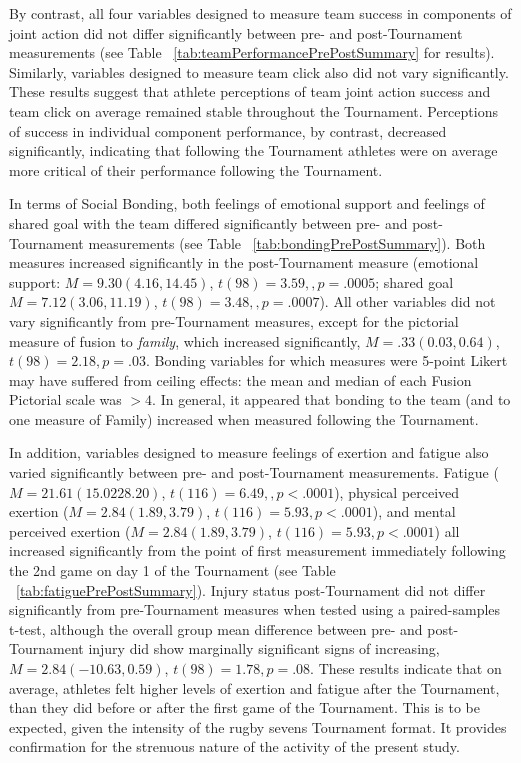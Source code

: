 By contrast, all four variables designed to measure team success in components of joint action did not differ significantly between pre- and post-Tournament measurements (see Table ~\ref{tab:teamPerformancePrePostSummary} for results).  Similarly, variables designed to measure team click also did not vary significantly.  These results suggest that athlete perceptions of team joint action success and team click on average remained stable throughout the Tournament.  Perceptions of success in individual component performance, by contrast, decreased significantly, indicating that following the Tournament athletes were on average more critical of their performance following the Tournament.

In terms of Social Bonding, both feelings of emotional support and feelings of shared goal with the team differed significantly between pre- and post-Tournament measurements (see Table ~\ref{tab:bondingPrePostSummary}). Both measures increased significantly in the post-Tournament measure (emotional support: $M = 9.30 (4.16, 14.45)$, $t(98)= 3.59,, p = .0005$; shared goal $M = 7.12 (3.06, 11.19)$, $t(98)= 3.48,, p = .0007$).  All other variables did not vary significantly from pre-Tournament measures, except for the pictorial measure of fusion to \textit{family}, which increased significantly, $M = .33 (0.03, 0.64)$, $t(98)= 2.18, p = .03$.  Bonding variables for which measures were 5-point Likert may have suffered from ceiling effects: the mean and median of each Fusion Pictorial scale was $> 4$.  In general, it appeared that bonding to the team (and to one measure of Family) increased when measured following the Tournament.

In addition, variables designed to measure feelings of exertion and fatigue also varied significantly between pre- and post-Tournament measurements.  Fatigue ($M = 21.61 (15.02 28.20)$, $t(116)= 6.49,, p < .0001$), physical perceived exertion ($M = 2.84 (1.89, 3.79)$, $t(116)= 5.93, p < .0001$), and mental perceived exertion ($M = 2.84 (1.89, 3.79)$, $t(116)= 5.93, p < .0001$) all increased significantly from the point of first measurement immediately following the 2nd game on day 1 of the Tournament (see Table ~\ref{tab:fatiguePrePostSummary}).  Injury status post-Tournament did not differ significantly from pre-Tournament measures when tested using a paired-samples t-test, although the overall group mean difference between pre- and post-Tournament injury did show marginally significant signs of increasing, $M = 2.84 (-10.63, 0.59)$, $t(98)= 1.78, p = .08$.
These results indicate that on average, athletes felt higher levels of exertion and fatigue after the Tournament, than they did before or after the first game of the Tournament. This is to be expected, given the intensity of the rugby sevens Tournament format. It provides confirmation for the strenuous nature of the activity of the present study.





